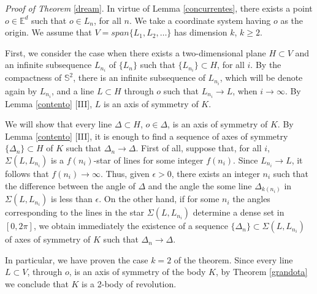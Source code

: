 \documentclass[12pt,thmsa]{amsart}
\newcommand{\Ed}{\mathbb{E}^{d}}
\begin{document}

\textit{Proof of Theorem} \ref{dream}. In virtue of Lemma \ref{concurrentes}, there exists a point $o\in \Ed$ such that  $o\in L_n$, for all $n$. We take a coordinate system having $o$ as the origin. We assume that $V=span\{L_1,L_2,\ldots\}$ has dimension $k$, $k\geq 2$.  

First, we consider the case when there exists a two-dimensional plane $H\subset V$ and an infinite subsequence $L_{n_i}$ of $\{L_n\}$ such that $\{L_{n_i}\} \subset H$, for all $i$. By the compactness 
of $\mathbb{S}^{2}$, there is an infinite subsequence of $L_{n_i}$, which will be denote again by $L_{n_i}$, and a line $L\subset H$ through $o$ such that $L_{n_i} \rightarrow L$, when $i \rightarrow \infty$. By Lemma \ref{contento} [III], $L$ is an axis of symmetry of $K$.


We will show  that every line $\Delta \subset H$,  $o \in \Delta$, is an axis of symmetry of  $K$. By Lemma \ref{contento} [III], it is enough to find a sequence of axes of symmetry $\{\Delta_n\}\subset H$ of $K$ such that $\Delta_n \rightarrow \Delta$.  First of all,  suppose that, for all $i$, $\Sigma (L,L_{n_i})$ is a $f(n_i)$-star of lines for some integer $f(n_i)$. Since  $L_{n_i} \rightarrow L$, it follows  that $f(n_i) \rightarrow \infty$. Thus, given $\epsilon > 0$, there exists an integer $n_i$ such that  the difference between the angle of $\Delta$ and the angle the some line $\Delta_{k(n_i)}$ in $\Sigma (L,L_{n_i})$ is less than $\epsilon$. %
On the other hand, if for some $n_i$ the angles corresponding to the lines in  the star $\Sigma (L,L_{n_{i}})$ determine a dense set in $[0,2\pi]$, we obtain immediately the existence of a sequence 
$\{\Delta_n\}\subset \Sigma (L,L_{n_i})$ of axes of symmetry of $K$ such that $\Delta_n \rightarrow \Delta$. 

In particular, we have proven the case  $k=2$ of the theorem. Since every line $L\subset V$, through $o$, is an axis of symmetry of the body $K$, by Theorem \ref{grandota} we conclude that $K$ is a 2-body of revolution. 

\end{document}
